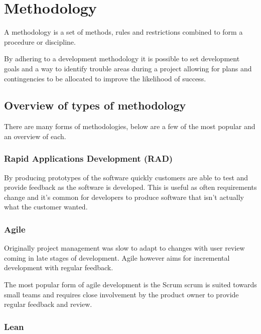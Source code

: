 \section{Methodology}\label{methodology}

A methodology is a set of methods, rules and restrictions combined to
form a procedure or discipline.

By adhering to a development methodology it is possible to set
development goals and a way to identify trouble areas during a project
allowing for plans and contingencies to be allocated to improve the
likelihood of success.

\subsection{Overview of types of
methodology}\label{overview-of-types-of-methodology}

There are many forms of methodologies, below are a few of the most
popular and an overview of each.

\subsubsection{Rapid Applications Development
(RAD)}\label{rapid-applications-development-rad}

By producing prototypes of the software quickly customers are able to
test and provide feedback as the software is developed. This is useful
as often requirements change and it's common for developers to produce
software that isn't actually what the customer wanted.

\subsubsection{Agile}\label{agile}

Originally project management was slow to adapt to changes with user
review coming in late stages of development. Agile however aims for
incremental development with regular feedback. \parencite{agile}

The most popular form of agile development is the Scrum
\parencite{agile} scrum is suited towards small teams and requires close
involvement by the product owner to provide regular feedback and review.

\subsubsection{Lean}\label{lean}

